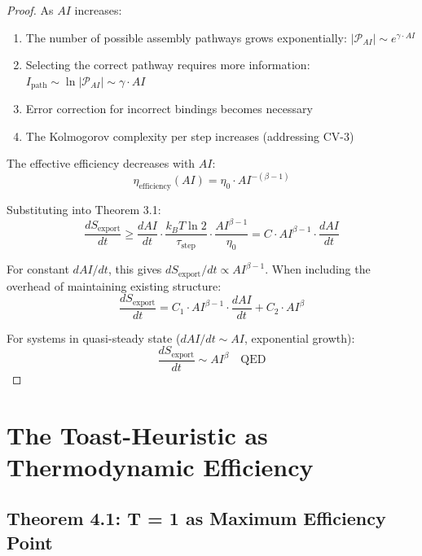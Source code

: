 \documentclass[11pt,a4paper]{article}
\begin{document}
\begin{proof}
As $AI$ increases:
\begin{enumerate}[label=(\roman*)]
\item The number of possible assembly pathways grows exponentially: $|\mathcal{P}_{AI}| \sim e^{\gamma \cdot AI}$
\item Selecting the correct pathway requires more information: $I_{\text{path}} \sim \ln |\mathcal{P}_{AI}| \sim \gamma \cdot AI$
\item Error correction for incorrect bindings becomes necessary
\item The Kolmogorov complexity per step increases (addressing CV-3)
\end{enumerate}

The effective efficiency decreases with $AI$:
\begin{equation}
\eta_{\text{efficiency}}(AI) = \eta_0 \cdot AI^{-(\beta - 1)}
\end{equation}

Substituting into Theorem 3.1:
\begin{equation}
\frac{dS_{\text{export}}}{dt} \geq \frac{dAI}{dt} \cdot \frac{k_B T \ln 2}{\tau_{\text{step}}} \cdot \frac{AI^{\beta - 1}}{\eta_0} = C \cdot AI^{\beta - 1} \cdot \frac{dAI}{dt}
\end{equation}

For constant $dAI/dt$, this gives $dS_{\text{export}}/dt \propto AI^{\beta - 1}$. When including the overhead of maintaining existing structure:
\begin{equation}
\frac{dS_{\text{export}}}{dt} = C_1 \cdot AI^{\beta - 1} \cdot \frac{dAI}{dt} + C_2 \cdot AI^{\beta}
\end{equation}

For systems in quasi-steady state ($dAI/dt \sim AI$, exponential growth):
\begin{equation}
\frac{dS_{\text{export}}}{dt} \sim AI^{\beta} \quad \text{QED}
\end{equation}
\end{proof}


\section{The Toast-Heuristic as Thermodynamic Efficiency}

\subsection{Theorem 4.1: T = 1 as Maximum Efficiency Point}
\end{document}
